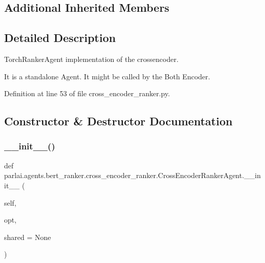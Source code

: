 \subsection*{Additional Inherited Members}


\subsection{Detailed Description}
\begin{DoxyVerb}TorchRankerAgent implementation of the crossencoder.

It is a standalone Agent. It might be called by the Both Encoder.
\end{DoxyVerb}
 

Definition at line 53 of file cross\+\_\+encoder\+\_\+ranker.\+py.



\subsection{Constructor \& Destructor Documentation}
\mbox{\label{classparlai_1_1agents_1_1bert__ranker_1_1cross__encoder__ranker_1_1CrossEncoderRankerAgent_ab7f5e55dec9f12dc4e4dccc48c682e63}} 
\subsubsection{\texorpdfstring{\+\_\+\+\_\+init\+\_\+\+\_\+()}{\_\_init\_\_()}}
{\footnotesize\ttfamily def parlai.\+agents.\+bert\+\_\+ranker.\+cross\+\_\+encoder\+\_\+ranker.\+Cross\+Encoder\+Ranker\+Agent.\+\_\+\+\_\+init\+\_\+\+\_\+ (\begin{DoxyParamCaption}\item[{}]{self,  }\item[{}]{opt,  }\item[{}]{shared = {\ttfamily None} }\end{DoxyParamCaption})}



